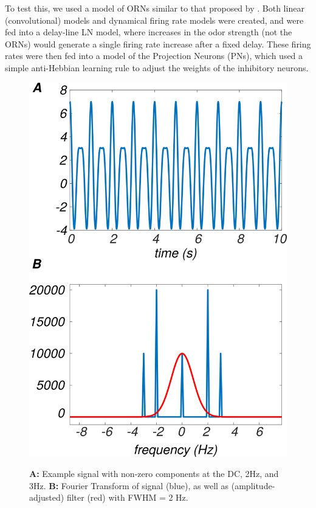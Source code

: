 \documentclass[a4paper,12pt,twoside]{article}
\begin{document}
To test this, we used a model of ORNs similar to that proposed by \citet{Nagel2011}.  Both linear (convolutional) models and dynamical firing rate models were created, and were fed into a delay-line LN model, where increases in the odor strength (not the ORNs) would generate a single firing rate increase after a fixed delay.  These firing rates were then fed into a model of the Projection Neurons (PNs), which used a simple anti-Hebbian learning rule to adjust the weights of the inhibitory neurons.  
\begin{figure}
\centering

\caption{\textbf{A:} Example signal with non-zero components at the DC, 2Hz, and 3Hz.  \textbf{B:} Fourier Transform of signal (blue), as well as (amplitude-adjusted) filter (red) with FWHM = 2 Hz.\newline}
\hspace*{-3.25cm}
\includegraphics[scale=0.7]{2016-06-16FilterExample.png}
\label{fig:filt}
\end{figure}
\end{document}
